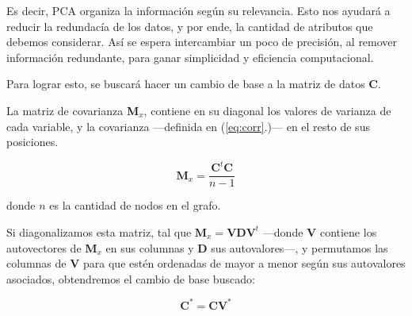 Es decir, PCA organiza la información según su relevancia. Esto nos ayudará a reducir la redundacía de los datos, y por ende, la cantidad de atributos que debemos considerar. Así se espera intercambiar un poco de precisión, al remover información redundante, para ganar simplicidad y eficiencia computacional.


\vspace{1em}
\noindent Para lograr esto, se buscará hacer un cambio de base a la matriz de datos \textbf{C}. 

\vspace{1em}
La matriz de covarianza \textbf{M}$_x$, contiene en su diagonal los valores de varianza de cada variable, y la covarianza ---definida en (\ref{eq:corr}.)--- en el resto de sus posiciones. %

\vspace{1em}
\begin{equation}
	\mathbf{M}_x = \frac{\mathbf{C}^t \mathbf{C}}{n-1}
\end{equation}

\vspace{1em}
\noindent donde $n$ es la cantidad de nodos en el grafo.

\vspace{1em}
Si diagonalizamos esta matriz, tal que $\mathbf{M}_x = \mathbf{V} \mathbf{D} \mathbf{V}^t$ ---donde \textbf{V} contiene los autovectores de \textbf{M}$_x$ en sus columnas y \textbf{D} sus autovalores---, y permutamos las columnas de $\textbf{V}$ para que estén ordenadas de mayor a menor según sus autovalores asociados, obtendremos el cambio de base buscado:

\vspace{1em}
\begin{equation}
    \mathbf{C}^* = \mathbf{C} \mathbf{V}^*
\end{equation}

